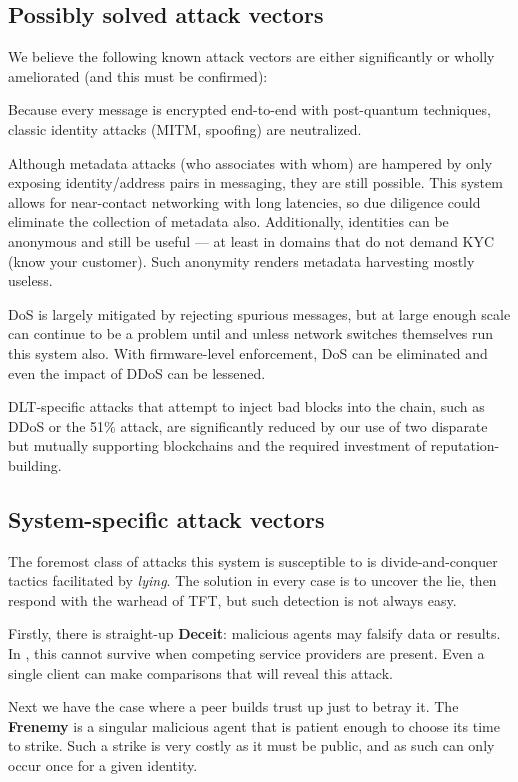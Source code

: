 \subsection{Possibly solved attack vectors}\label{subsec:possibly-solved}

We believe the following known attack vectors are either significantly or wholly ameliorated (and this must be confirmed):

Because every message is encrypted end-to-end with post-quantum techniques, classic identity attacks (MITM, spoofing) are neutralized.

Although metadata attacks (who associates with whom) are hampered by only exposing identity/address pairs in messaging, they are still possible.
This system allows for near-contact networking with long latencies, so due diligence could eliminate the collection of metadata also.
Additionally, identities can be anonymous and still be useful --- at least in domains that do not demand KYC (know your customer).
Such anonymity renders metadata harvesting mostly useless.

DoS is largely mitigated by rejecting spurious messages, but at large enough scale can continue to be a problem until and unless network switches themselves run this system also.
With firmware-level enforcement, DoS can be eliminated and even the impact of DDoS can be lessened.

DLT-specific attacks that attempt to inject bad blocks into the chain, such as DDoS or the 51\% attack, are significantly reduced by our use of two disparate but mutually supporting blockchains and the required investment of reputation-building.


\subsection{System-specific attack vectors}\label{subsec:system-specific}

The foremost class of attacks this system is susceptible to is divide-and-conquer tactics facilitated by \textit{lying}.
The solution in every case is to uncover the lie, then respond with the warhead of TFT, but such detection is not always easy.

Firstly, there is straight-up \textbf{Deceit}: malicious agents may falsify data or results.
In \projectName, this cannot survive when competing service providers are present.
Even a single client can make comparisons that will reveal this attack.

Next we have the case where a peer builds trust up just to betray it.
The \textbf{Frenemy} is a singular malicious agent that is patient enough to choose its time to strike.
Such a strike is very costly as it must be public, and as such can only occur once for a given identity.


